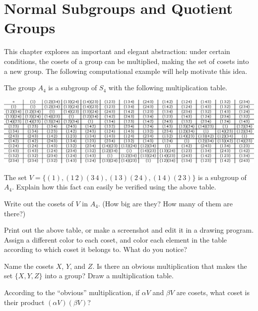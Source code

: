 \chapter{Normal Subgroups and Quotient Groups}

This chapter explores an important and elegant abstraction: under certain conditions, the cosets of a group can be multiplied, making the set of cosets into a new group. The following computational example will help motivate this idea.
\begin{annotation}
\end{annotation}

\begin{problem}\label{prob:a4comp}
The group \(A_4\)  is a subgroup of \(S_4\) with the following multiplication table.
\begin{center}
\includegraphics[width=\textwidth]{a4.eps}
\end{center}
\begin{problemparts}
  \item The set \(V=\{(1),(1\,2)(3\,4), (1\,3)(2\,4) , (1\,4)(2\,3)\} \) is a subgroup of \(A_4\). Explain how this fact can easily be verified using the above table.
  \item Write out the cosets of \(V\) in \(A_4\). (How big are they? How many of them are there?)
  \item Print out the above table, or make a screenshot and edit it in a drawing program. Assign a different color to each coset, and color each element in the table according to which coset it belongs to. What do you notice?
  \item Name the cosets \(X\), \(Y\), and \(Z\). Is there an obvious multiplication that makes the set \(\{X,Y,Z\}\) into a group? Draw a multiplication table.
  \item According to the ``obvious'' multiplication, if \(\alpha V\) and \(\beta V\) are cosets, what coset is their product \((\alpha V)(\beta V)\)?
\end{problemparts}
\end{problem}


